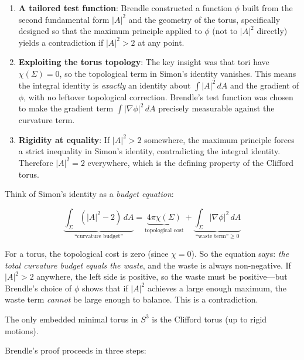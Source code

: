\begin{enumerate}
\item \textbf{A tailored test function}: Brendle constructed a function $\phi$ built from the second fundamental form $|A|^2$ and the geometry of the torus, specifically designed so that the maximum principle applied to $\phi$ (not to $|A|^2$ directly) yields a contradiction if $|A|^2 > 2$ at any point.

\item \textbf{Exploiting the torus topology}: The key insight was that tori have $\chi(\Sigma) = 0$, so the topological term in Simon's identity vanishes. This means the integral identity is \emph{exactly} an identity about $\int |A|^2\,dA$ and the gradient of $\phi$, with no leftover topological correction. Brendle's test function was chosen to make the gradient term $\int |\nabla\phi|^2\,dA$ precisely measurable against the curvature term.

\item \textbf{Rigidity at equality}: If $|A|^2 > 2$ somewhere, the maximum principle forces a strict inequality in Simon's identity, contradicting the integral identity. Therefore $|A|^2 = 2$ everywhere, which is the defining property of the Clifford torus.
\end{enumerate}

Think of Simon's identity as a \emph{budget equation}:

\[
\underbrace{\int_\Sigma (|A|^2 - 2)\,dA}_{\text{``curvature budget''}} = \underbrace{4\pi \chi(\Sigma)}_{\text{topological cost}} + \underbrace{\int_\Sigma |\nabla \phi|^2\,dA}_{\text{``waste term''} \ge 0}
\]

For a torus, the topological cost is zero (since $\chi = 0$). So the equation says: \emph{the total curvature budget equals the waste}, and the waste is always non-negative. If $|A|^2 > 2$ anywhere, the left side is positive, so the waste must be positive---but Brendle's choice of $\phi$ shows that if $|A|^2$ achieves a large enough maximum, the waste term \emph{cannot} be large enough to balance. This is a contradiction.

\begin{theorem}
The only embedded minimal torus in $S^3$ is the Clifford torus (up to rigid motions).
\end{theorem}

Brendle's proof proceeds in three steps:

